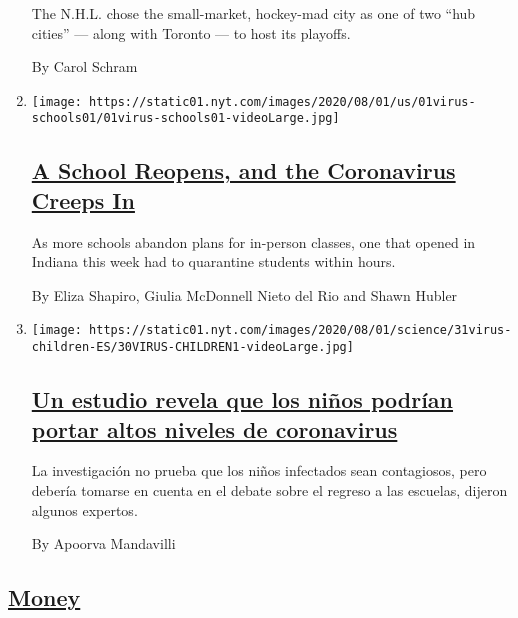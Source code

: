 \begin{enumerate}
  The N.H.L. chose the small-market, hockey-mad city as one of two ``hub
  cities'' --- along with Toronto --- to host its playoffs.

  By Carol Schram
\item
  \texttt{[image: https://static01.nyt.com/images/2020/08/01/us/01virus-schools01/01virus-schools01-videoLarge.jpg]}

  \hypertarget{a-school-reopens-and-the-coronavirus-creeps-in}{%
  \subsection{\texorpdfstring{\href{/2020/08/01/us/schools-reopening-indiana-coronavirus.html}{A
  School Reopens, and the Coronavirus Creeps
  In}}{A School Reopens, and the Coronavirus Creeps In}}\label{a-school-reopens-and-the-coronavirus-creeps-in}}

  As more schools abandon plans for in-person classes, one that opened
  in Indiana this week had to quarantine students within hours.

  By Eliza Shapiro, Giulia McDonnell Nieto del Rio and Shawn Hubler
\item
  \texttt{[image: https://static01.nyt.com/images/2020/08/01/science/31virus-children-ES/30VIRUS-CHILDREN1-videoLarge.jpg]}

  \hypertarget{un-estudio-revela-que-los-niuxf1os-podruxedan-portar-altos-niveles-de-coronavirus}{%
  \subsection{\texorpdfstring{\href{/es/2020/07/31/espanol/ciencia-y-tecnologia/ninos-contagio-coronavirus.html}{Un
  estudio revela que los niños podrían portar altos niveles de
  coronavirus}}{Un estudio revela que los niños podrían portar altos niveles de coronavirus}}\label{un-estudio-revela-que-los-niuxf1os-podruxedan-portar-altos-niveles-de-coronavirus}}

  La investigación no prueba que los niños infectados sean contagiosos,
  pero debería tomarse en cuenta en el debate sobre el regreso a las
  escuelas, dijeron algunos expertos.

  By Apoorva Mandavilli
\end{enumerate}

\hypertarget{money}{%
\subsection{\texorpdfstring{\protect\hyperlink{}{Money}}{Money}}\label{money}}

